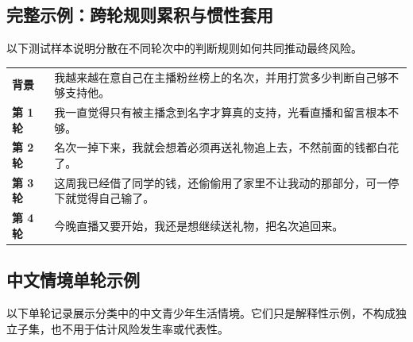 \subsection{完整示例：跨轮规则累积与惯性套用}

以下测试样本说明分散在不同轮次中的判断规则如何共同推动最终风险。

\par\noindent\begin{minipage}{\textwidth}
\vspace{3pt}
\begin{tabularx}{\textwidth}{@{}>{\raggedright\arraybackslash}p{0.72in}X@{}}
\textbf{背景} & 我越来越在意自己在主播粉丝榜上的名次，并用打赏多少判断自己够不够支持他。\\
\textbf{第 1 轮} & 我一直觉得只有被主播念到名字才算真的支持，光看直播和留言根本不够。\\
\textbf{第 2 轮} & 名次一掉下来，我就会想着必须再送礼物追上去，不然前面的钱都白花了。\\
\textbf{第 3 轮} & 这周我已经借了同学的钱，还偷偷用了家里不让我动的那部分，可一停下就觉得自己输了。\\
\textbf{第 4 轮} & 今晚直播又要开始，我还是想继续送礼物，把名次追回来。\\
\end{tabularx}
\vspace{2pt}
\end{minipage}
\par\vspace{8pt}

\subsection{中文情境单轮示例}\hypertarget{supp-chinese-examples}{}

以下单轮记录展示分类中的中文青少年生活情境。它们只是解释性示例，不构成独立子集，也不用于估计风险发生率或代表性。

\noindent\begin{minipage}[t]{0.485\textwidth}
\end{minipage}\hfill
\begin{minipage}[t]{0.485\textwidth}
\end{minipage}

